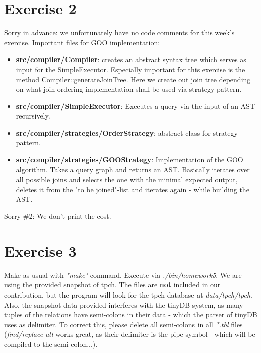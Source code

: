 \documentclass[paper=a4, fontsize=11pt]{scrartcl} %
\numberwithin{equation}{section} %
\numberwithin{figure}{section} %
\numberwithin{table}{section} %
\begin{document}
\section{Exercise 2}
Sorry in advance: we unfortunately have no code comments for this week's exercise. Important files for GOO implementation:
\begin{itemize}
	\item \textbf{src/compiler/Compiler}: creates an abstract syntax tree which serves as input for the SimpleExecutor. Especially important for this exercise is the method Compiler::generateJoinTree. Here we create out join tree depending on what join ordering implementation shall be used via strategy pattern. 
	\item \textbf{src/compiler/SimpleExecutor}: Executes a query via the input of an AST recursively.
	\item \textbf{src/compiler/strategies/OrderStrategy}: abstract class for strategy pattern.
	\item \textbf{src/compiler/strategies/GOOStrategy}: Implementation of the GOO algorithm. Takes a query graph and returns an AST. Basically iterates over all possible joins and selects the one with the minimal expected output, deletes it from the "to be joined"-list and iterates again - while building the AST.
\end{itemize}

Sorry \#2: We don't print the cost.

\section{Exercise 3}
Make as usual with \textit{"make"} command. Execute via \textit{./bin/homework5}. We are using the provided snapshot of tpch. The files are \textbf{not} included in our contribution, but the program will look for the tpch-database at \textit{data/tpch/tpch}. Also, the snapshot data provided interferes with the tinyDB system, as many tuples of the relations have semi-colons in their data - which the parser of tinyDB uses as delimiter. To correct this, please delete all semi-colons in all \textit{*.tbl} files (\textit{find/replace all} works great, as their delimiter is the pipe symbol - which will be compiled to the semi-colon...). 
\end{document}
